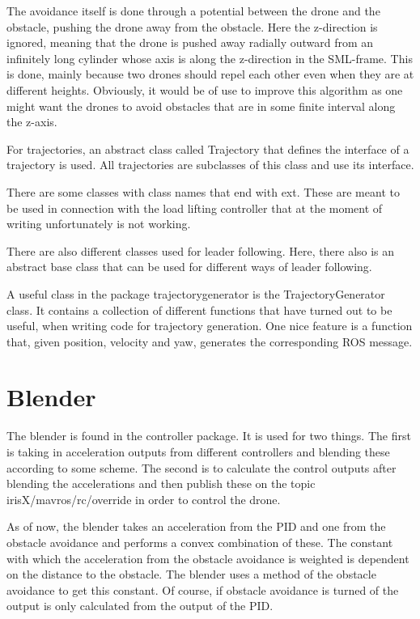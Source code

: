 \documentclass[titlepage,11pt,a4paper]{article}
\begin{document}
The avoidance itself is done through a potential between the drone and the obstacle, pushing the drone away from the obstacle. Here the z-direction is ignored, meaning that the drone is pushed away radially outward from an infinitely long cylinder whose axis is along the z-direction in the SML-frame.
This is done, mainly because two drones should repel each other even when they are at different heights. Obviously, it would be of use to improve this algorithm as one might want the drones to avoid obstacles that are in some finite interval along the z-axis. 

For trajectories, an abstract class called Trajectory that defines the interface of a trajectory is used. All trajectories are subclasses of this class and use its interface.

There are some classes with class names that end with \textunderscore ext. These are meant to be used in connection with the load lifting controller that at the moment of writing unfortunately is not working. 

There are also different classes used for leader following. Here, there also is an abstract base class that can be used for different ways of leader following.

A useful class in the package trajectory\textunderscore generator is the TrajectoryGenerator class. It contains a collection of different functions that have turned out to be useful, when writing code for trajectory generation. One nice feature is a function that, given position, velocity and yaw, generates the corresponding ROS message.

\section{Blender}
\label{sec:blender}

The blender is found in the controller package. It is used for two things. The first is taking in acceleration outputs from different controllers and blending these according to some scheme. The second is to calculate the control outputs after blending the accelerations and then publish these on the topic irisX/mavros/rc/override in order to control the drone.

As of now, the blender takes an acceleration from the PID and one from the obstacle avoidance and performs a convex combination of these. The constant with which the acceleration from the obstacle avoidance is weighted is dependent on the distance to the obstacle. The blender uses a method of the obstacle avoidance to get this constant. Of course, if obstacle avoidance is turned of the output is only calculated from the output of the PID.
\end{document}
